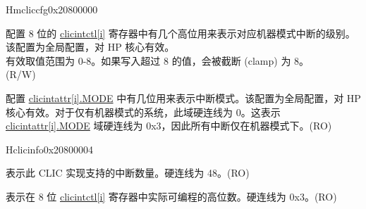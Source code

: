 \begin{register}{H}{{mcliccfg}}{0x20800000}\label{regdesc:MCLICCFG_REG}
%
%
%
\regnewline%
\begin{regdesc}
\begin{reglist}
\label{fielddesc:MCLICCFG_MNLBITS}\item [MNLBITS] 配置 8 位的 \hyperref[regdesc:MCLICINTCTL_REG_i]{clicintctl[i]} 寄存器中有几个高位用来表示对应机器模式中断的级别。该配置为全局配置，对 HP 核心有效。\\
有效取值范围为 0-8。如果写入超过 8 的值，会被截断 (clamp) 为 8。\\
(R/W)
\label{fielddesc:MCLICCFG_NMBITS}\item [NMBITS] 配置 \hyperref[fielddesc:MCLICINTATTR_i_MODE]{clicintattr[i].MODE} 中有几位用来表示中断模式。该配置为全局配置，对 HP 核心有效。对于仅有机器模式的系统，此域硬连线为 0。这表示 \hyperref[fielddesc:MCLICINTATTR_i_MODE]{clicintattr[i].MODE} 域硬连线为 0x3，因此所有中断仅在机器模式下。(RO) \\
\end{reglist}
\end{regdesc}
\end{register}


\begin{register}{H}{{clicinfo}}{0x20800004}\label{regdesc:CLICINFO_REG}
%
%
%
%
\regnewline%
\begin{regdesc}
\begin{reglist}
\label{fielddesc:CLICINFO_NUM_INTERRUPTS}\item [NUM\_INTERRUPTS] 表示此 CLIC 实现支持的中断数量。硬连线为 48。(RO)
\label{fielddesc:CLICINFO_CLICINTCTLBITS}\item [CLICINTCTLBITS] 表示在 8 位 \hyperref[regdesc:MCLICINTCTL_REG_i]{clicintctl[i]} 寄存器中实际可编程的高位数。硬连线为 0x3。(RO)
\end{reglist}
\end{regdesc}
\end{register}


